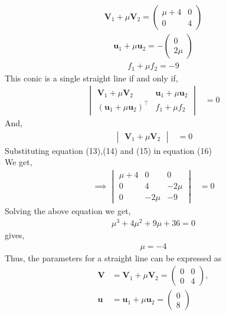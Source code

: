 \documentclass[10pt,a4paper]{report}
\newcommand{\myvec}[1]{\ensuremath{\begin{pmatrix}#1\end{pmatrix}}}
\let\vec\mathbf
\let\vec\mathbf
\newcommand{\mydet}[1]{\ensuremath{\begin{vmatrix}#1\end{vmatrix}}}
\providecommand{\brak}[1]{\ensuremath{\left(#1\right)}}
\begin{document}
\begin{multicols}{2}
\begin{align}
\vec{V}_1+\mu\vec{V}_2= \myvec{
\mu+4 & 0\\
0 & 4
}
\end{align}
\begin{align}
\vec{u}_1+\mu\vec{u}_2= -\myvec{
0\\
2\mu
}
\end{align}
\begin{align}
f_1+\mu f_2= -9
\end{align}
This conic is a single straight line if and only if, \\ \vspace{1mm}
\begin{align}
\mydet{\vec{V}_1 + \mu\vec{V}_2 & \vec{u}_1+\mu \vec{u}_2\\ \brak{\vec{u}_1+\mu \vec{u}_2}^{\top} & f_1 + \mu f_2} &= 0
\end{align}
And,\\
\begin{align}
\mydet{\vec{V}_1 + \mu\vec{V}_2} &= 0
\end{align}
Substituting equation (13),(14) and (15) in equation (16)\\ \vspace{1mm}
We get,\\ \vspace{1mm}
\begin{align}
\implies \mydet{\mu+4 & 0 & 0\\ 
0 & 4 & -2\mu \\
0 & -2\mu & -9
} &= 0
\end{align}
Solving the above equation we get,\\ \vspace{1mm}
\begin{align}
\mu^3 + 4\mu^2 + 9\mu + 36=0
\end{align}
gives,\\ \vspace{1mm}
\begin{align}
    \mu = -4
\end{align}
 Thus, the parameters for a straight line can be expressed as\\ \vspace{1mm}
 \begin{align}
	\vec{V} &= 
\vec{V}_1 + \mu\vec{V}_2
=\myvec{ 0 & 0 \\ 0 & 4},
\\
	\vec{u} &=
\vec{u}_1+\mu \vec{u}_2
	= \myvec{
0\\
8
    }
\\

\end{align}
\end{multicols}
\end{document}
